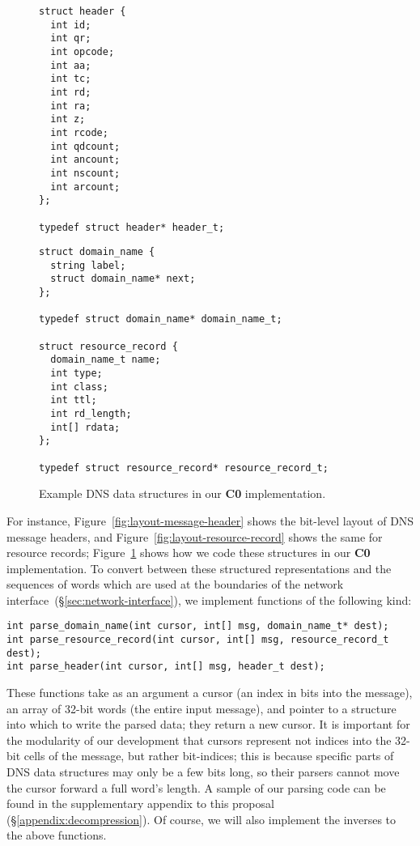 \documentclass{article}
\newcommand\Kwd[1]{{\sffamily\bfseries{#1}}}
\begin{document}
\begin{figure}
  \begin{lstlisting}[frame=single]
struct header {
  int id;
  int qr;
  int opcode;
  int aa;
  int tc;
  int rd;
  int ra;
  int z;
  int rcode;
  int qdcount;
  int ancount;
  int nscount;
  int arcount;
};

typedef struct header* header_t;
  \end{lstlisting}

  \begin{lstlisting}[frame=single]
struct domain_name {
  string label;
  struct domain_name* next;
};

typedef struct domain_name* domain_name_t;

struct resource_record {
  domain_name_t name;
  int type;
  int class;
  int ttl;
  int rd_length;
  int[] rdata;
};

typedef struct resource_record* resource_record_t;
  \end{lstlisting}
  \caption{Example DNS data structures in our \Kwd{C0} implementation.}\label{fig:c0-data-structures}
\end{figure}

For instance, Figure~\ref{fig:layout-message-header} shows the
bit-level layout of DNS message headers, and
Figure~\ref{fig:layout-resource-record} shows the same for resource
records; Figure~\ref{fig:c0-data-structures} shows how we code these
structures in our \Kwd{C0} implementation. To convert between these
structured representations and the sequences of words which are used
at the boundaries of the network
interface~(\S\ref{sec:network-interface}), we implement functions of
the following kind:

\begin{lstlisting}
int parse_domain_name(int cursor, int[] msg, domain_name_t* dest);
int parse_resource_record(int cursor, int[] msg, resource_record_t dest);
int parse_header(int cursor, int[] msg, header_t dest);
\end{lstlisting}

These functions take as an argument a cursor (an index in bits into
the message), an array of 32-bit words (the entire input message), and
pointer to a structure into which to write the parsed data; they
return a new cursor. It is important for the modularity of our
development that cursors represent not indices into the 32-bit cells
of the message, but rather bit-indices; this is because specific parts
of DNS data structures may only be a few bits long, so their parsers
cannot move the cursor forward a full word's length.
%
A sample of our parsing code can be found in the supplementary
appendix to this proposal (\S\ref{appendix:decompression}). Of
course, we will also implement the inverses to the above functions.
\end{document}

